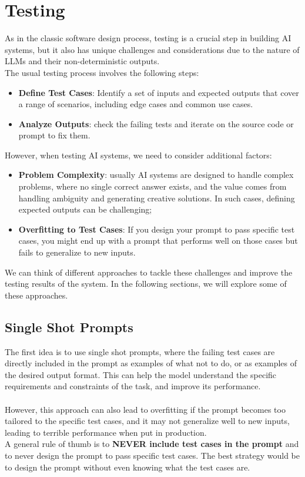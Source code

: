 \section{Testing}
As in the classic software design process, testing is a crucial step in building AI systems, 
but it also has unique challenges and considerations due to the nature of LLMs and their non-deterministic outputs.
\\
The usual testing process involves the following steps:
\begin{itemize}
    \item \textbf{Define Test Cases}: Identify a set of inputs and expected outputs that cover a range of scenarios, including edge cases and common use cases.
    \item \textbf{Analyze Outputs}: check the failing tests and iterate on the source code or prompt to fix them.
\end{itemize}
However, when testing AI systems, we need to consider additional factors:
\begin{itemize}
    \item \textbf{Problem Complexity}: usually AI systems are designed to handle complex problems, where no
    single correct answer exists, and the value comes from handling ambiguity and generating creative solutions.
    In such cases, defining expected outputs can be challenging;
    \item \textbf{Overfitting to Test Cases}: If you design your prompt to pass specific test cases, 
    you might end up with a prompt that performs well on those cases but fails to generalize to new inputs.
\end{itemize}
We can think of different approaches to tackle these challenges and improve the testing results of the system. 
In the following sections, we will explore some of these approaches.

\subsection{Single Shot Prompts}
The first idea is to use single shot prompts, where the failing test cases are directly included in the prompt as examples of what not to do, or as examples of the desired output format.
This can help the model understand the specific requirements and constraints of the task, and improve its performance.
\\\\
However, this approach can also lead to overfitting if the prompt becomes too tailored to the specific test cases, and it may not generalize well to new inputs, leading
to terrible performance when put in production.
\\
A general rule of thumb is to \textbf{NEVER include test cases in the prompt} and to never design the prompt to pass specific test cases. 
The best strategy would be to design the prompt without even knowing what the test cases are.

